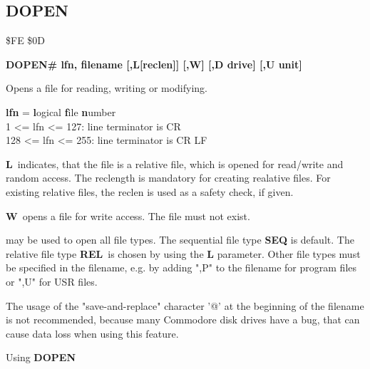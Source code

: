 \subsection{DOPEN}
\begin{description}[leftmargin=3cm,style=nextline]
\item [Token:] \$FE \$0D
\item [Format:]
  {\bf DOPEN\# lfn, filename [,L[reclen]] [,W] [,D drive] [,U unit] }
\item [Usage:]
   Opens a file for reading, writing or
   modifying.

   {\bf lfn} = {\bf l}ogical {\bf f}ile {\bf n}umber \\
   1 <= lfn <= 127: line terminator is CR \\
   128 <= lfn <= 255: line terminator is CR LF

   {\bf L} indicates, that the file is a relative file, which
   is opened for read/write and random access. The reclength
   is mandatory for creating realative files. For existing
   relative files, the reclen is used as a safety check, if given.

   {\bf W} opens a file for write access. The file must not exist.

   \filenamedefinition

   \drivedefinition

   \unitdefinition

\item [Remarks:]
    may be used to open all file types.
   The sequential file type {\bf SEQ} is default.
   The relative file type {\bf REL} is chosen by using the
   {\bf L} parameter.  Other file types
   must be specified in the filename, e.g. by adding ",P" to the
   filename for program files or ",U" for USR files.

   The usage of the "save-and-replace" character '@' at the
   beginning of the filename is not recommended, because many
   Commodore disk drives have a bug, that can cause data loss
   when using this feature.

\item [Example:] Using {\bf DOPEN}

\end{description}

